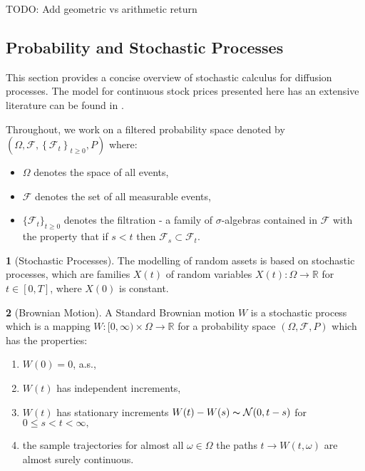 \documentclass[british]{amsart} \usepackage{lmodern}
\numberwithin{equation}{section} \numberwithin{figure}{section}
\theoremstyle{plain} \newtheorem{thm}{\protect\theoremname}[section]
\theoremstyle{definition} \newtheorem{defn}[thm]{\protect\definitionname}
\theoremstyle{plain} \newtheorem{assumption}[thm]{\protect\assumptionname}
\theoremstyle{plain} \newtheorem{lem}[thm]{\protect\lemmaname}
\theoremstyle{plain} \newtheorem{prop}[thm]{\protect\propositionname}
\theoremstyle{remark} \newtheorem{rem}[thm]{\protect\remarkname}
\theoremstyle{plain} \newtheorem{cor}[thm]{\protect\corollaryname}
\begin{document}
TODO: Add geometric vs arithmetic return

\subsection{Probability and Stochastic Processes}

This section provides a concise overview of stochastic calculus for
diffusion processes. The model for continuous stock prices presented
here has an extensive literature can be found in \cite{shreve1991}.

Throughout, we work on a filtered probability space denoted
by $(\Omega,\mathcal{F},\left\{ \mathcal{F}_{t}\right\} _{t\ge0},P)$
where:

\begin{itemize}
  \item $\Omega$ denotes the space of all events,
  \item $\mathcal{F}$ denotes the set of all measurable events,
  \item $\{ \mathcal{F}_{t}\}_{t\ge0}$ denotes the filtration
        - a family of $\sigma$-algebras contained in $\mathcal{F}$ with
        the property that if $s<t$ then $\mathcal{F}_{s}\subset\mathcal{F}_{t}$. 
\end{itemize}

\begin{defn} [Stochastic Processes]
  The modelling of random assets is based on stochastic processes, which are
  families $X(t)$  of random variables $X(t):\Omega\to\mathbb{R}$ for $t\in[0,T]$,
  where $X(0)$ is constant.
\end{defn}

\begin{defn} [Brownian Motion]
  A Standard Brownian motion $W$ is a stochastic process which
  is a mapping $W:[0,\infty)\times\Omega\to\mathbb{R}$ for a probability
  space $(\Omega,\mathcal{F},P)$ which has the properties:

  \begin{enumerate}
    \item $W(0)=0$, a.s.,
    \item $W(t)$ has independent increments,
    \item $W(t)$ has stationary increments $W(t)-W(s)\thicksim\mathcal{N}(0,t-s)$
          for $0\le s<t<\infty,$
    \item the sample trajectories for almost all $\omega\in\Omega$ the paths
          $t\to W(t,\omega)$ are almost surely continuous.
  \end{enumerate}
\end{defn}
\end{document}
